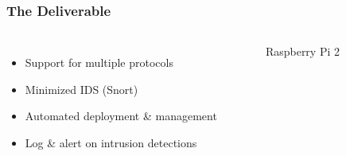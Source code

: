 \begin{frame}
\frametitle{The Deliverable}

\begin{columns}
\begin{itemize}
    \item Support for multiple protocols
    \item Minimized IDS (Snort)
    \item Automated deployment \& management
    \item Log \& alert on intrusion detections
\end{itemize}
\begin{figure}[pi]
\caption{Raspberry Pi 2}
\end{figure}
\end{columns}
\end{frame}
